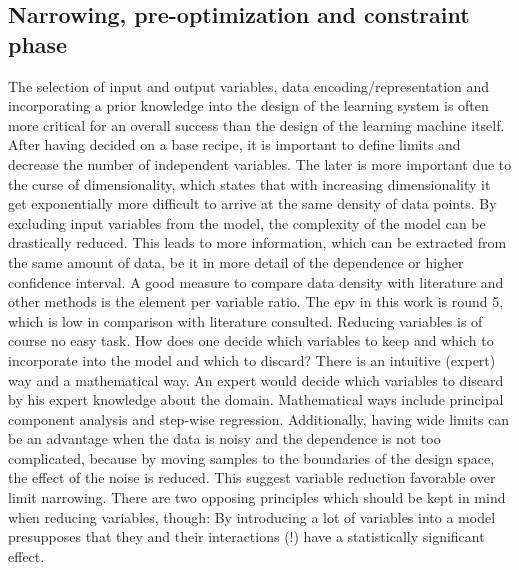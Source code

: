 \subsection{Narrowing, pre-optimization and constraint phase}
\label{sec:phase2}
The selection of input and output variables, data encoding/representation and incorporating a prior knowledge into the design of the learning system is often more critical for an overall success than the design of the learning machine itself\cite{cherkassky1998learning}. %
After having decided on a base recipe, it is important to define limits and decrease the number of independent variables. 
The later is more important due to the curse of dimensionality\cite{cherkassky1998learning}, 
which states that with increasing dimensionality it get exponentially more difficult to arrive at the same density of data points. 
By excluding input variables from the model, 
the complexity of the model can be drastically reduced. 
This leads to more information, which can be extracted from the same amount of data, 
be it in more detail of the dependence or higher confidence interval. 
A good measure to compare data density with literature and other methods is the element per variable ratio.
The \gls{epv} in this work is round 5,
which is low in comparison with literature consulted\cite{
ahmed2017preparation,
fernandes2010multi,
kaczmarowski2015genetic,
mahdavi2017hardness,
soltanali2014neural,
panwar2014design,
schubert2008design,
shanaghi2013experimental}.
Reducing variables is of course no easy task.
How does one decide which variables to keep and which to incorporate into the model and which to discard? 
There is an intuitive (expert) way and a mathematical way.
An expert would decide which variables to discard by his expert knowledge about the domain. 
Mathematical ways include principal component analysis and step-wise regression.
%
Additionally, having wide limits can be an advantage when the data is noisy and the dependence is not too complicated, because by moving samples to the boundaries of the design space, the effect of the noise is reduced\cite{giunta2003overview}. 
This suggest variable reduction favorable over limit narrowing.
%
There are two opposing principles which should be kept in mind when reducing variables, though:
By introducing a lot of variables into a model presupposes that they and their interactions (!) have a statistically significant effect\cite{gunst2009fractional}.
